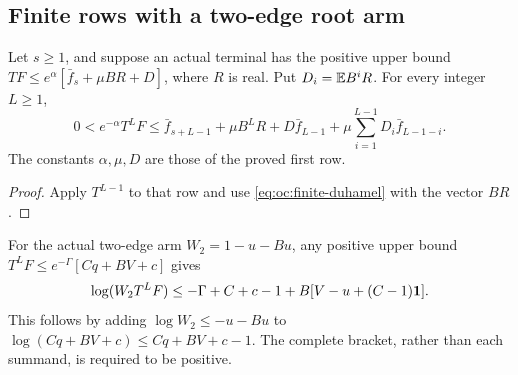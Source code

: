 \subsection{Finite rows with a two-edge root arm}
\label{sec:odd-common:w2}

\begin{lemma}
\label{lem:odd-common:anchored-continuation}
Let \(s\ge1\), and suppose an actual terminal has the positive upper bound
\(TF\le e^\alpha[\bar f_s+\mu BR+D]\), where \(R\) is real.
Put \(D_i=\mathbb E B^iR\). For every integer \(L\ge1\),
\begin{equation}\label{eq:odd-common:anchored-continuation}
 0<e^{-\alpha}T^LF\le
 \bar f_{s+L-1}+\mu B^LR+D\bar f_{L-1}
       +\mu\sum_{i=1}^{L-1}D_i\bar f_{L-1-i}.
\end{equation}
The constants \(\alpha,\mu,D\) are those of the proved first row.
\end{lemma}
\begin{proof}
Apply \(T^{L-1}\) to that row and use
\eqref{eq:oc:finite-duhamel} with the vector \(BR\).

\end{proof}

For the actual two-edge arm \(W_2=1-u-Bu\), any positive upper bound
\(T^LF\le e^{-\Gamma}[Cq+BV+c]\) gives
\begin{equation}\label{eq:odd-common:w2-majorant}
 \log(W_2T^LF)\le-\Gamma+C+c-1
                   +B[V-u+(C-1)\mathbf1].
\end{equation}
This follows by adding \(\log W_2\le-u-Bu\) to
\(\log(Cq+BV+c)\le Cq+BV+c-1\).
The complete bracket, rather than each summand, is required to be positive.

